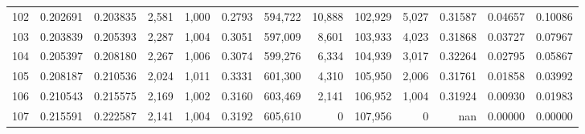 \begin{tabular}{rrrrrrrrrrrrr}
102 &  0.202691 &  0.203835 &   2,581 &  1,000 &                                     0.2793 &  594,722 &   10,888 &  102,929 &    5,027 &  0.31587 &  0.04657 &  0.10086 \\
103 &  0.203839 &  0.205393 &   2,287 &  1,004 &                                     0.3051 &  597,009 &    8,601 &  103,933 &    4,023 &  0.31868 &  0.03727 &  0.07967 \\
104 &  0.205397 &  0.208180 &   2,267 &  1,006 &                                     0.3074 &  599,276 &    6,334 &  104,939 &    3,017 &  0.32264 &  0.02795 &  0.05867 \\
105 &  0.208187 &  0.210536 &   2,024 &  1,011 &                                     0.3331 &  601,300 &    4,310 &  105,950 &    2,006 &  0.31761 &  0.01858 &  0.03992 \\
106 &  0.210543 &  0.215575 &   2,169 &  1,002 &                                     0.3160 &  603,469 &    2,141 &  106,952 &    1,004 &  0.31924 &  0.00930 &  0.01983 \\
107 &  0.215591 &  0.222587 &   2,141 &  1,004 &                                     0.3192 &  605,610 &        0 &  107,956 &        0 &      nan &  0.00000 &  0.00000 \\
\bottomrule
\end{tabular}
